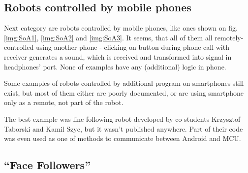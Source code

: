 \subsection{Robots controlled by mobile phones}
Next category are robots controlled by mobile phones, like ones shown on fig.
\ref{img:SoA1}, \ref{img:SoA2} and \ref{img:SoA3}.
It seems, that all of them all remotely-controlled using another phone -
clicking on button during phone call with receiver generates a sound, which is received and transformed into
signal in headphones' port.
None of examples have any (additional) logic in phone. 

Some examples of robots controlled by additional program on smartphones
still exist, but most of them either are poorly documented, or are using
smartphone only as a remote, not part of the robot. 

The best example was line-following robot developed by co-students Krzysztof
Taborski and Kamil Szyc, but it wasn't published anywhere.
Part of their code was even used as one of methods to communicate between
Android and MCU.


\subsection{``Face Followers''}

